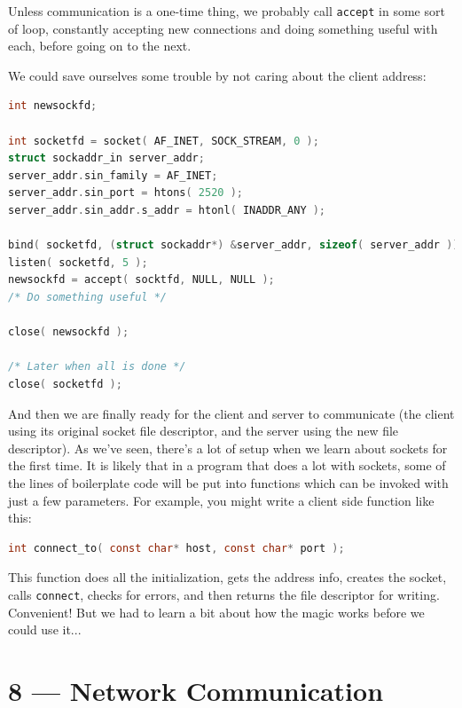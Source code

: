 \documentclass[a4paper]{report}
\begin{document}
Unless communication is a one-time thing, we probably call \texttt{accept} in some sort of loop, constantly accepting new connections and doing something useful with each, before going on to the next.

We could save ourselves some trouble by not caring about the client address:

\begin{lstlisting}[language=C]
int newsockfd;

int socketfd = socket( AF_INET, SOCK_STREAM, 0 );
struct sockaddr_in server_addr;
server_addr.sin_family = AF_INET;
server_addr.sin_port = htons( 2520 );
server_addr.sin_addr.s_addr = htonl( INADDR_ANY );

bind( socketfd, (struct sockaddr*) &server_addr, sizeof( server_addr ));
listen( socketfd, 5 );
newsockfd = accept( socktfd, NULL, NULL );
/* Do something useful */

close( newsockfd );

/* Later when all is done */
close( socketfd );
\end{lstlisting}

And then we are finally ready for the client and server to communicate (the client using its original socket file descriptor, and the server using the new file descriptor). As we've seen, there's a lot of setup when we learn about sockets for the first time. It is likely that in a program that does a lot with sockets, some of the lines of boilerplate code will be put into functions which can be invoked with just a few parameters. For example, you might write a client side function like this:

\begin{lstlisting}[language=C]
int connect_to( const char* host, const char* port ); 
\end{lstlisting}

This function does all the initialization, gets the address info, creates the socket, calls \texttt{connect}, checks for errors, and then returns the file descriptor for writing. Convenient! But we had to learn a bit about how the magic works before we could use it...








\chapter*{8 --- Network Communication}

\end{document}
